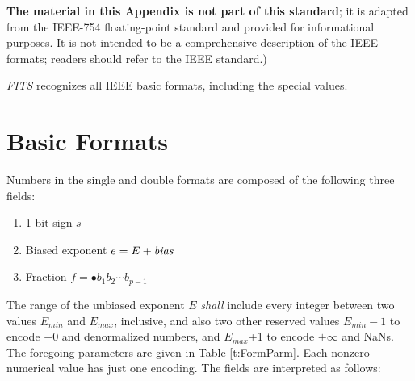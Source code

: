 \documentclass[11pt,makeidx]{book}     %
\begin{document}
 {\bf The material in this Appendix is not part
 of this standard}; it is adapted from the IEEE-754
 floating-point standard \cite{ieee85} and provided for
 informational purposes. It is not intended to be a comprehensive
 description of the IEEE formats; readers should refer to the IEEE
 standard.)                                                          
 
 {\em FITS\/} recognizes all IEEE basic formats, 
 including the special values.
 
\section{Basic Formats}
 Numbers in the single and double formats are composed of the following
 three fields:
 \begin{enumerate}
  \item 1-bit sign $s$ 
  \item Biased exponent $e=E+\mbox{{\it bias}}$ 
  \item Fraction $f= \bullet b_{1} b_{2} \cdots b_{p-1}$
 \end{enumerate} 
The range of the unbiased exponent $E$ {\em shall} include every integer
between two values $E_{min}$ and $E_{max}$, inclusive, and
also two other reserved values $E_{min}-1$ to encode $\pm 0$ and
denormalized numbers, and $E_{max}$+1 to encode $\pm\infty$ and
NaNs. The foregoing parameters are given in Table \ref{t:FormParm}. 
Each nonzero numerical value has just one encoding.  The fields are
interpreted as follows:                                     
\end{document}

